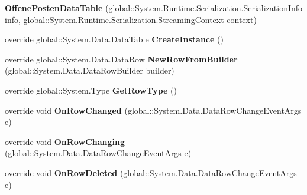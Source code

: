 \begin{DoxyCompactItemize}
\item 
{\bfseries Offene\+Posten\+Data\+Table} (global\+::\+System.\+Runtime.\+Serialization.\+Serialization\+Info info, global\+::\+System.\+Runtime.\+Serialization.\+Streaming\+Context context)\hypertarget{class_products_1_1_data_1_1ds_sage_1_1_offene_posten_data_table_a89f19d76fd77e8be0b1a128d6919b7c4}{}\label{class_products_1_1_data_1_1ds_sage_1_1_offene_posten_data_table_a89f19d76fd77e8be0b1a128d6919b7c4}

\item 
override global\+::\+System.\+Data.\+Data\+Table {\bfseries Create\+Instance} ()\hypertarget{class_products_1_1_data_1_1ds_sage_1_1_offene_posten_data_table_aefe1e09c9e71a06be0babbb611c4680e}{}\label{class_products_1_1_data_1_1ds_sage_1_1_offene_posten_data_table_aefe1e09c9e71a06be0babbb611c4680e}

\item 
override global\+::\+System.\+Data.\+Data\+Row {\bfseries New\+Row\+From\+Builder} (global\+::\+System.\+Data.\+Data\+Row\+Builder builder)\hypertarget{class_products_1_1_data_1_1ds_sage_1_1_offene_posten_data_table_a663dc35f648a8a1031e6a38a714884a8}{}\label{class_products_1_1_data_1_1ds_sage_1_1_offene_posten_data_table_a663dc35f648a8a1031e6a38a714884a8}

\item 
override global\+::\+System.\+Type {\bfseries Get\+Row\+Type} ()\hypertarget{class_products_1_1_data_1_1ds_sage_1_1_offene_posten_data_table_a5069e31badfb4225b91f0456f9d8ec81}{}\label{class_products_1_1_data_1_1ds_sage_1_1_offene_posten_data_table_a5069e31badfb4225b91f0456f9d8ec81}

\item 
override void {\bfseries On\+Row\+Changed} (global\+::\+System.\+Data.\+Data\+Row\+Change\+Event\+Args e)\hypertarget{class_products_1_1_data_1_1ds_sage_1_1_offene_posten_data_table_a3dce03d343a43b4ef7790deec677cb3f}{}\label{class_products_1_1_data_1_1ds_sage_1_1_offene_posten_data_table_a3dce03d343a43b4ef7790deec677cb3f}

\item 
override void {\bfseries On\+Row\+Changing} (global\+::\+System.\+Data.\+Data\+Row\+Change\+Event\+Args e)\hypertarget{class_products_1_1_data_1_1ds_sage_1_1_offene_posten_data_table_afa6a586a8d712946e9468fafa59e6f31}{}\label{class_products_1_1_data_1_1ds_sage_1_1_offene_posten_data_table_afa6a586a8d712946e9468fafa59e6f31}

\item 
override void {\bfseries On\+Row\+Deleted} (global\+::\+System.\+Data.\+Data\+Row\+Change\+Event\+Args e)\hypertarget{class_products_1_1_data_1_1ds_sage_1_1_offene_posten_data_table_aab88bf1fbd8324d7eda74edcb51bdb0a}{}\label{class_products_1_1_data_1_1ds_sage_1_1_offene_posten_data_table_aab88bf1fbd8324d7eda74edcb51bdb0a}


\end{DoxyCompactItemize}
